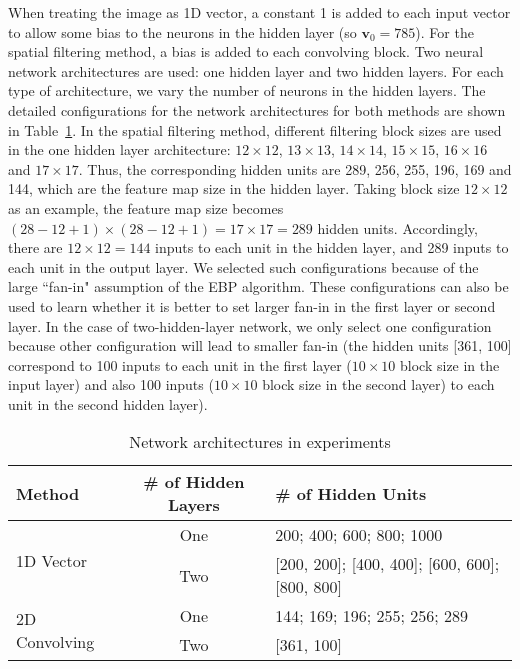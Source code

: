 \documentclass{article} %
\begin{document}
When treating the image as 1D vector, a constant 1 is added to each input vector to allow some bias to the neurons in the hidden layer (so $\textbf{v}_0 = 785$). For the spatial filtering method, a bias is added to each convolving block.  Two neural network architectures are used: one hidden layer and two hidden layers.  For each type of architecture, we vary the number of neurons in the hidden layers. The detailed configurations for the network architectures for both methods are shown in Table~\ref{tab:config}. In the spatial filtering method, different filtering block sizes are used in the one hidden layer architecture: $12 \times 12$, $13 \times 13$, $14 \times 14$, $15 \times 15$, $16 \times 16$ and $17 \times 17$. Thus, the corresponding hidden units are 289, 256, 255, 196, 169 and 144, which are the feature map size in the hidden layer. Taking block size $12 \times 12$ as an example, the feature map size becomes $(28 - 12 + 1) \times (28 - 12 + 1) = 17 \times 17 = 289$ hidden units. Accordingly, there are $12 \times 12 = 144$ inputs to each unit in the hidden layer, and 289 inputs to each unit in the output layer. We selected such configurations because of the large ``fan-in" assumption of the EBP algorithm. These configurations can also be used to learn whether it is better to set larger fan-in in the first layer or second layer. In the case of two-hidden-layer network, we only select one configuration because other configuration will lead to smaller fan-in (the hidden units [361, 100] correspond to 100 inputs to each unit in the first layer ($10 \times 10$ block size in the input layer) and also 100 inputs ($10 \times 10$ block size in the second layer) to each unit in the second hidden layer).

\begin{table}
\centering
\caption{Network architectures in experiments}
\begin{tabular}{|l||c||l|}
 \hline
    Method  & \# of Hidden Layers & \# of Hidden Units \\ \hline \hline
    \multirow{2}{*}{1D Vector}  & One & 200; 400; 600; 800; 1000 \\ \cline{2-3}
     & Two & [200, 200]; [400, 400]; [600, 600]; [800, 800] \\ \hline
    \multirow{2}{*}{2D Convolving} & One & 144; 169; 196; 255; 256; 289 \\ \cline{2-3}
     & Two & [361, 100] \\\hline

\end{tabular}
 \label{tab:config}
\end{table}
\end{document}
